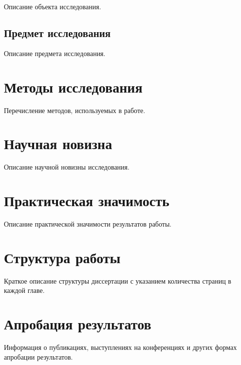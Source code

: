 Описание объекта исследования.

\subsection{Предмет исследования}

Описание предмета исследования.

\section{Методы исследования}

Перечисление методов, используемых в работе.

\section{Научная новизна}

Описание научной новизны исследования.

\section{Практическая значимость}

Описание практической значимости результатов работы.

\section{Структура работы}

Краткое описание структуры диссертации с указанием количества страниц в каждой главе.

\section{Апробация результатов}

Информация о публикациях, выступлениях на конференциях и других формах апробации результатов.
